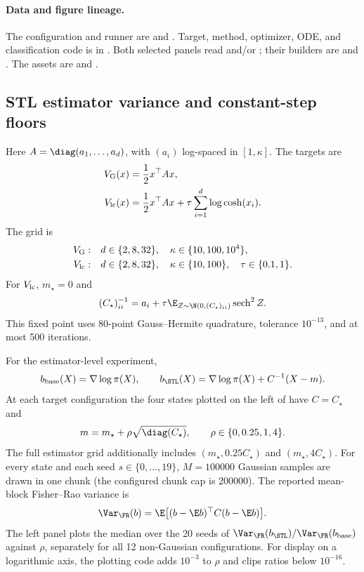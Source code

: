 \paragraph{Data and figure lineage.}
\begingroup\small\raggedright
The configuration and runner are
 and
.
Target, method, optimizer, ODE, and classification code is in
.  Both selected panels read
 and/or
; their
builders are
and .  The assets are
 and
.
\par\endgroup

\subsection{STL estimator variance and constant-step floors}

Here \(A=\diag(a_1,\ldots,a_d)\), with \((a_i)\) log-spaced in
\([1,\kappa]\).  The targets are
\begin{align*}
  V_{\rm G}(x)&=\frac12x^\top Ax,\\
  V_{\rm lc}(x)&=\frac12x^\top Ax+\tau\sum_{i=1}^d\log\cosh(x_i).
\end{align*}
The grid is
\begin{align*}
  V_{\rm G}:&\quad d\in\{2,8,32\},\quad
       \kappa\in\{10,100,10^4\},\\
  V_{\rm lc}:&\quad d\in\{2,8,32\},\quad
       \kappa\in\{10,100\},\quad \tau\in\{0.1,1\}.
\end{align*}
For \(V_{\rm lc}\), \(m_\star=0\) and
\[
  (C_\star)_{ii}^{-1}
  =a_i+\tau\E_{Z\sim\N(0,(C_\star)_{ii})}\operatorname{sech}^2Z.
\]
This fixed point uses 80-point Gauss--Hermite quadrature, tolerance
\(10^{-13}\), and at most 500 iterations.

For the estimator-level experiment,
\[
  b_{\rm base}(X)=\nabla\log\pi(X),\qquad
  b_{\STL}(X)=\nabla\log\pi(X)+C^{-1}(X-m).
\]
At each target configuration the four states plotted on the left of
 have \(C=C_\star\) and
\[
  m=m_\star+\rho\sqrt{\diag(C_\star)},
  \qquad \rho\in\{0,0.25,1,4\}.
\]
The full estimator grid additionally includes
\((m_\star,0.25C_\star)\) and \((m_\star,4C_\star)\).  For every state and
each seed \(s\in\{0,\ldots,19\}\), \(M=100000\) Gaussian samples are drawn
in one chunk (the configured chunk cap is 200000).  The reported mean-block
Fisher--Rao variance is
\[
  \Var_{\FR}(b)=
  \E\bigl[(b-\E b)^\top C(b-\E b)\bigr].
\]
The left panel plots the median over the 20 seeds of
\(\Var_{\FR}(b_{\STL})/\Var_{\FR}(b_{\rm base})\) against \(\rho\), separately
for all 12 non-Gaussian configurations.  For display on a logarithmic axis,
the plotting code adds \(10^{-3}\) to \(\rho\) and clips ratios below
\(10^{-16}\).

